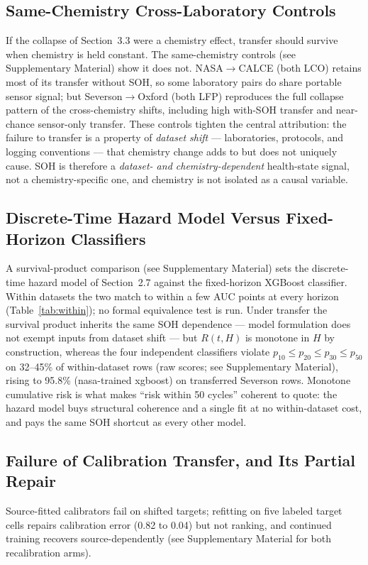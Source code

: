 \documentclass[preprint,12pt]{elsarticle}
\begin{document}
\subsection{Same-Chemistry Cross-Laboratory Controls}
If the collapse of Section~3.3 were a chemistry effect, transfer should survive when chemistry is held constant. The same-chemistry controls (see Supplementary Material) show it does not. NASA$\to$CALCE (both LCO) retains most of its transfer without SOH, so some laboratory pairs do share portable sensor signal; but Severson$\to$Oxford (both LFP) reproduces the full collapse pattern of the cross-chemistry shifts, including high with-SOH transfer and near-chance sensor-only transfer. These controls tighten the central attribution: the failure to transfer is a property of \emph{dataset shift} --- laboratories, protocols, and logging conventions --- that chemistry change adds to but does not uniquely cause. SOH is therefore a \emph{dataset- and chemistry-dependent} health-state signal, not a chemistry-specific one, and chemistry is not isolated as a causal variable.



\subsection{Discrete-Time Hazard Model Versus Fixed-Horizon Classifiers}
A survival-product comparison (see Supplementary Material) sets the discrete-time hazard model of Section~2.7 against the fixed-horizon XGBoost classifier. Within datasets the two match to within a few AUC points at every horizon (Table~\ref{tab:within}); no formal equivalence test is run. Under transfer the survival product inherits the same SOH dependence --- model formulation does not exempt inputs from dataset shift --- but $R(t,H)$ is monotone in $H$ by construction, whereas the four independent classifiers violate $p_{10}\le p_{20}\le p_{30}\le p_{50}$ on 32--45\% of within-dataset rows (raw scores; see Supplementary Material), rising to 95.8\% (nasa-trained xgboost) on transferred Severson rows. Monotone cumulative risk is what makes ``risk within 50 cycles'' coherent to quote: the hazard model buys structural coherence and a single fit at no within-dataset cost, and pays the same SOH shortcut as every other model.





\subsection{Failure of Calibration Transfer, and Its Partial Repair}
Source-fitted calibrators fail on shifted targets; refitting on five labeled target cells repairs calibration error (0.82 to 0.04) but not ranking, and continued training recovers source-dependently (see Supplementary Material for both recalibration arms).
\end{document}

